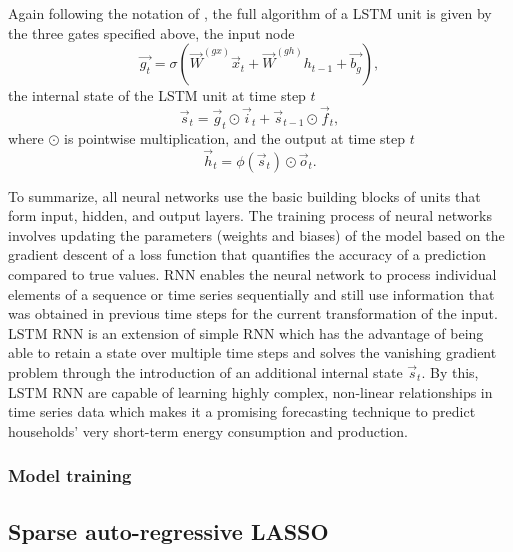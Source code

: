 Again following the notation of \citet{Lipton:2015}, the full algorithm of a LSTM unit is given by the three gates specified above, the input node
%
\begin{equation} \label{LSTMinput}
    \vec{g_t}=\sigma\left(\vec{W}^{(gx)}\vec{x}_t+\vec{W}^{(gh)}h_{t-1}+\vec{b_g}\right),
\end{equation}
%
the internal state of the LSTM unit at time step $t$
%
\begin{equation} \label{LSTMstate}
    \vec{s}_t=\vec{g}_t\odot\vec{i}_t+\vec{s}_{t-1}\odot\vec{f}_t,
\end{equation}
%
where $\odot$ is pointwise multiplication, and the output at time step $t$
%
\begin{equation} \label{LSTMoutput}
    \vec{h}_t=\phi\left(\vec{s}_t\right)\odot\vec{o}_t.
\end{equation}
%

To summarize, all neural networks use the basic building blocks of units that form input, hidden, and output layers. The training process of neural networks involves updating the parameters (weights and biases) of the model based on the gradient descent of a loss function that quantifies the accuracy of a prediction compared to true values. RNN enables the neural network to process individual elements of a sequence or time series sequentially and still use information that was obtained in previous time steps for the current transformation of the input. LSTM RNN is an extension of simple RNN which has the advantage of being able to retain a state over multiple time steps and solves the vanishing gradient problem through the introduction of an additional internal state $\vec{s}_t$. By this, LSTM RNN are capable of learning highly complex, non-linear relationships in time series data which makes it a promising forecasting technique to predict households' very short-term energy consumption and production.



\subsubsection{Model training}




\subsection{Sparse auto-regressive LASSO} \label{Sec:Method;Subsec:LASSO}



